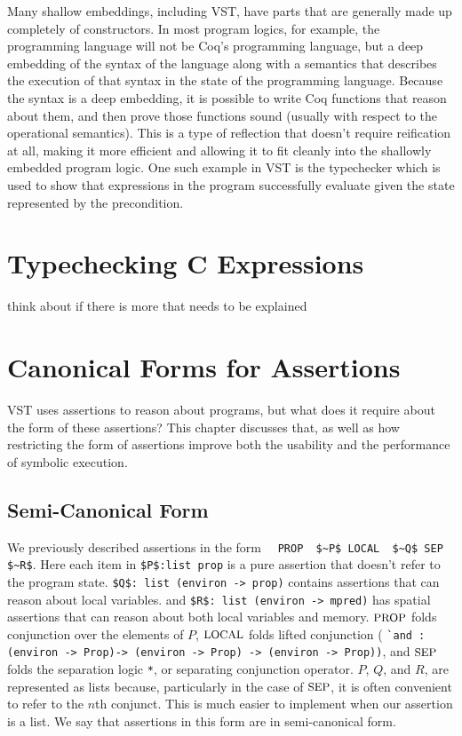 \documentclass{puthesis}
\begin{document}

Many shallow embeddings, including VST, have parts that are generally
made up completely of constructors. In most program logics, for
example, the programming language will not be Coq's programming
language, but a deep embedding of the syntax of the language along
with a semantics that describes the execution of that syntax in the
state of the programming language. Because the syntax is a deep
embedding, it is possible to write Coq functions that reason about
them, and then prove those functions sound (usually with respect to
the operational semantics). This is a type of reflection that doesn't
require reification at all, making it more efficient and allowing it
to fit cleanly into the shallowly embedded program logic. One such
example in VST is the typechecker which is used to show that
expressions in the program successfully evaluate given the state
represented by the precondition.


\chapter{Typechecking C Expressions}
think about if there is more that needs to be explained

\chapter{Canonical Forms for Assertions}

VST uses assertions to reason about programs, but what does 
it require about the form of these assertions? This chapter
discusses that, as well as how restricting the form of
assertions improve both the usability and the performance
of symbolic execution.

\section{Semi-Canonical Form}

We previously described \cite{appel14:plcc} assertions in the form
~~\lstinline{PROP  $~P$ LOCAL  $~Q$ SEP  $~R$}. 
Here each item in \lstinline|$P$:list prop| is a pure assertion that 
doesn't refer to the program state. \lstinline|$Q$: list (environ -> prop)|
contains assertions that can reason about local variables. 
and \lstinline|$R$: list (environ -> mpred)| has spatial assertions that
can reason about both local variables and memory. 
$\mbox{\small PROP}$ folds conjunction over the elements of $P$, $\mbox{\small LOCAL}$
folds lifted conjunction (
\lstinline|`and : (environ -> Prop)-> (environ -> Prop) -> (environ -> Prop))|,
and $\mbox{\small SEP}$ folds the separation logic \lstinline|*|, or separating conjunction
operator. $P$, $Q$, and $R$, are represented as lists because, particularly 
in the case of $\mbox{\small SEP}$, it is often convenient to refer to the $n$th 
conjunct. This is much easier to implement when our assertion is a list. 
We say that assertions in this form are in semi-canonical form. 
\end{document}
